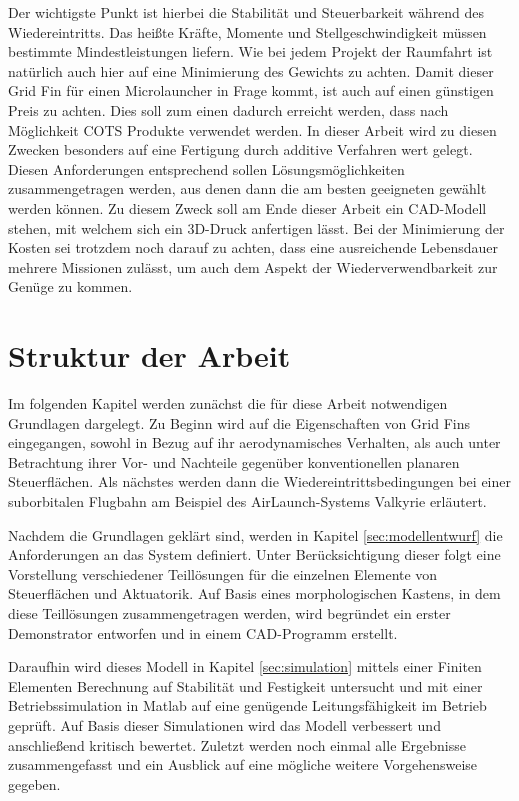 Der wichtigste Punkt ist hierbei die Stabilität und Steuerbarkeit während des Wiedereintritts. Das heißte Kräfte, Momente und Stellgeschwindigkeit müssen bestimmte Mindestleistungen liefern. Wie bei jedem Projekt der Raumfahrt ist natürlich auch hier auf eine Minimierung des Gewichts zu achten. Damit dieser Grid Fin für einen Microlauncher in Frage kommt, ist auch auf einen günstigen Preis zu achten. Dies soll zum einen dadurch erreicht werden, dass nach Möglichkeit \gls{COTS} Produkte verwendet werden. In dieser Arbeit wird zu diesen Zwecken besonders auf eine Fertigung durch additive Verfahren wert gelegt.
Diesen Anforderungen entsprechend sollen Lösungsmöglichkeiten zusammengetragen werden, aus denen dann die am besten geeigneten gewählt werden können. Zu diesem Zweck soll am Ende dieser Arbeit ein CAD-Modell stehen, mit welchem sich ein 3D-Druck anfertigen lässt. Bei der Minimierung der Kosten sei trotzdem noch darauf zu achten, dass eine ausreichende Lebensdauer mehrere Missionen zulässt, um auch dem Aspekt der Wiederverwendbarkeit zur Genüge zu kommen.

\section{Struktur der Arbeit}
Im folgenden Kapitel werden zunächst die für diese Arbeit notwendigen Grundlagen dargelegt. Zu Beginn wird auf die Eigenschaften von Grid Fins eingegangen, sowohl in Bezug auf ihr aerodynamisches Verhalten, als auch unter Betrachtung ihrer Vor- und Nachteile gegenüber konventionellen planaren Steuerflächen. Als nächstes werden dann die Wiedereintrittsbedingungen bei einer suborbitalen Flugbahn am Beispiel des AirLaunch-Systems Valkyrie erläutert.

Nachdem die Grundlagen geklärt sind, werden in Kapitel \ref{sec:modellentwurf} die Anforderungen an das System definiert. Unter Berücksichtigung dieser folgt eine Vorstellung verschiedener Teillösungen für die einzelnen Elemente von Steuerflächen und Aktuatorik. Auf Basis eines morphologischen Kastens, in dem diese Teillösungen zusammengetragen werden, wird begründet ein erster Demonstrator entworfen und in einem CAD-Programm erstellt.

Daraufhin wird dieses Modell in Kapitel \ref{sec:simulation} mittels einer Finiten Elementen Berechnung auf Stabilität und Festigkeit untersucht und mit einer Betriebssimulation in Matlab auf eine genügende
Leitungsfähigkeit im Betrieb geprüft. Auf Basis dieser Simulationen wird das Modell verbessert und anschließend kritisch bewertet.
Zuletzt werden noch einmal alle Ergebnisse zusammengefasst und ein Ausblick auf eine mögliche weitere Vorgehensweise gegeben.